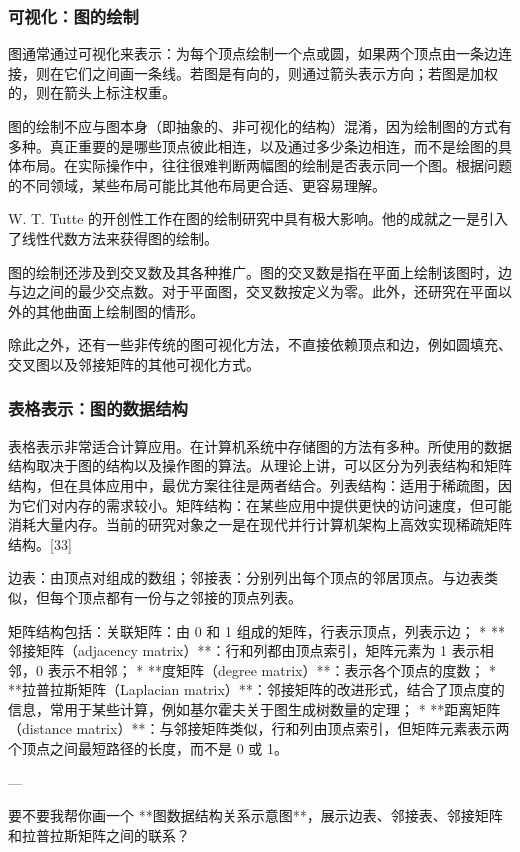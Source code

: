 \subsubsection{可视化：图的绘制}
图通常通过可视化来表示：为每个顶点绘制一个点或圆，如果两个顶点由一条边连接，则在它们之间画一条线。若图是有向的，则通过箭头表示方向；若图是加权的，则在箭头上标注权重。

图的绘制不应与图本身（即抽象的、非可视化的结构）混淆，因为绘制图的方式有多种。真正重要的是哪些顶点彼此相连，以及通过多少条边相连，而不是绘图的具体布局。在实际操作中，往往很难判断两幅图的绘制是否表示同一个图。根据问题的不同领域，某些布局可能比其他布局更合适、更容易理解。

W. T. Tutte 的开创性工作在图的绘制研究中具有极大影响。他的成就之一是引入了线性代数方法来获得图的绘制。

图的绘制还涉及到交叉数及其各种推广。图的交叉数是指在平面上绘制该图时，边与边之间的最少交点数。对于平面图，交叉数按定义为零。此外，还研究在平面以外的其他曲面上绘制图的情形。

除此之外，还有一些非传统的图可视化方法，不直接依赖顶点和边，例如圆填充、交叉图以及邻接矩阵的其他可视化方式。
\subsubsection{表格表示：图的数据结构}
表格表示非常适合计算应用。在计算机系统中存储图的方法有多种。所使用的数据结构取决于图的结构以及操作图的算法。从理论上讲，可以区分为列表结构和矩阵结构，但在具体应用中，最优方案往往是两者结合。列表结构：适用于稀疏图，因为它们对内存的需求较小。矩阵结构：在某些应用中提供更快的访问速度，但可能消耗大量内存。当前的研究对象之一是在现代并行计算机架构上高效实现稀疏矩阵结构。[33]

边表：由顶点对组成的数组；邻接表：分别列出每个顶点的邻居顶点。与边表类似，但每个顶点都有一份与之邻接的顶点列表。

矩阵结构包括：关联矩阵：由 0 和 1 组成的矩阵，行表示顶点，列表示边；
* **邻接矩阵（adjacency matrix）**：行和列都由顶点索引，矩阵元素为 1 表示相邻，0 表示不相邻；
* **度矩阵（degree matrix）**：表示各个顶点的度数；
* **拉普拉斯矩阵（Laplacian matrix）**：邻接矩阵的改进形式，结合了顶点度的信息，常用于某些计算，例如基尔霍夫关于图生成树数量的定理；
* **距离矩阵（distance matrix）**：与邻接矩阵类似，行和列由顶点索引，但矩阵元素表示两个顶点之间最短路径的长度，而不是 0 或 1。

---

要不要我帮你画一个 **图数据结构关系示意图**，展示边表、邻接表、邻接矩阵和拉普拉斯矩阵之间的联系？

